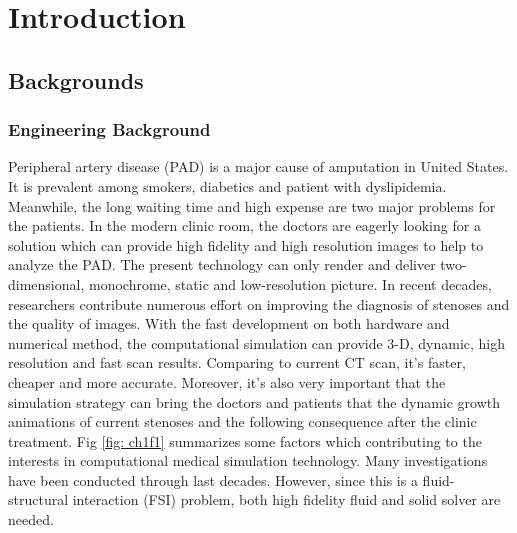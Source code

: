\chapter{Introduction}
\label{ch:chap1}


\section{Backgrounds}

\subsection{Engineering Background}

Peripheral artery disease (PAD) is a major cause of amputation in United States. It is prevalent among smokers, diabetics and patient with dyslipidemia. Meanwhile, the long waiting time and high expense are two major problems for the patients. In the modern clinic room, the doctors are eagerly looking for a solution which can provide high fidelity and high resolution images to help to analyze the PAD. The  present technology can only render and deliver two-dimensional,  monochrome, static and low-resolution picture. In recent decades, researchers contribute numerous effort on improving the diagnosis of stenoses and the quality of images\cite{clark1976fluid, nesbitt2009shear, wardlaw2006non, stergiopulos1992computer, long2001numerical}. With the fast development on both hardware and numerical method, the computational simulation can provide 3-D, dynamic, high resolution and fast scan results. Comparing to current CT scan, it's faster, cheaper and more accurate. Moreover, it's also very important that the simulation strategy can bring the doctors and patients that the dynamic growth animations of current stenoses and the following consequence after the clinic treatment. Fig \ref{fig: ch1f1} summarizes some factors which contributing to the interests in computational medical simulation technology\cite{barry2005features}. Many investigations have been conducted through last decades\cite{feng2012viscous, bertram2010evaluation, nadeem2010simulation, ogulu2005simulation}. However, since this is a fluid-structural interaction (FSI) problem, both high fidelity fluid and solid solver are needed. 

